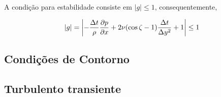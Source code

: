A condição para estabilidade consiste em $|g|\leq 1$, consequentemente,

\begin{equation}
	|g|=\left|-\frac{\Delta t}{\rho}\frac{\partial p}{\partial x}+2\nu(\cos\zeta-1)\frac{\Delta t}{\Delta y^2}+1\right|\leq 1
\end{equation}

\subsection{Condições de Contorno}

\subsection{Turbulento transiente}





